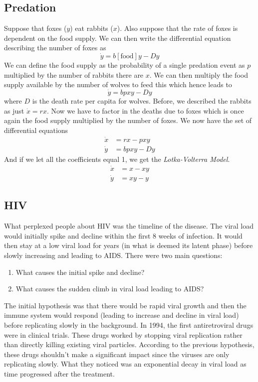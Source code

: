 \documentclass{article}
\theoremstyle{definition}
\begin{document}
\subsection{Predation}
Suppose that foxes ($y$) eat rabbits ($x$). Also suppose that the rate of foxes is dependent on the food supply. We can then write the differential equation describing the number of foxes as 
\begin{equation*}
    \dot y =b[\text{food}]y-Dy
\end{equation*}
We can define the food supply as the probability of a single predation event as $p$ multiplied by the number of rabbits there are $x$. We can then multiply the food supply available by the number of wolves to feed this which hence leads to 
\begin{equation*}
    \dot y=bpxy -Dy
\end{equation*}
where $D$ is the death rate per capita for wolves. Before, we described the rabbits as just $\dot x=rx$. Now we have to factor in the deaths due to foxes which is once again the food supply multiplied by the number of foxes. We now have the set of differential equations 
\begin{equation*}
    \begin{split}
        \dot x&=rx-pxy\\
        \dot y&=bpxy-Dy
    \end{split}
\end{equation*}
And if we let all the coefficients equal 1, we get the \emph{Lotka-Volterra Model}.
\begin{equation*}
    \begin{split}
        \dot x&=x-xy\\
        \dot y&=xy-y
    \end{split}
\end{equation*}
\subsection{HIV}
What perplexed people about HIV was the timeline of the disease. The viral load would initially spike and decline within the first 8 weeks of infection. It would then stay at a low viral load for years (in what is deemed its latent phase) before slowly increasing and leading to AIDS. There were two main questions:
\begin{enumerate}
    \item What causes the initial spike and decline?
    \item What causes the sudden climb in viral load leading to AIDS?
\end{enumerate}
The initial hypothesis was that there would be rapid viral growth and then the immune system would respond (leading to increase and decline in viral load) before replicating slowly in the background. In 1994, the first antiretroviral drugs were in clinical trials. These drugs worked by stopping viral replication rather than directly killing existing viral particles. According to the previous hypothesis, these drugs shouldn't make a significant impact since the viruses are only replicating slowly. What they noticed was an exponential decay in viral load as time progressed after the treatment. 
\end{document}
